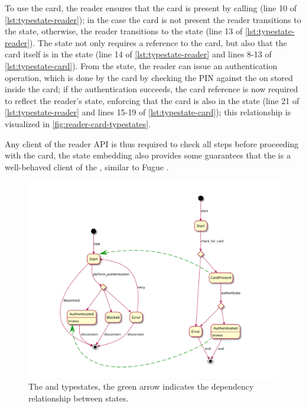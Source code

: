 To use the card, the reader ensures that the card is present by calling 
(line 10 of \autoref{lst:typestate-reader});
in the case the card is not present the reader transitions to the  state,
otherwise, the reader transitions to the  state (line 13 of \autoref{lst:typestate-reader}).
The  state not only requires a reference to the card,
but also that the card itself is in the  state (line 14 of \autoref{lst:typestate-reader}
and lines 8-13 of \autoref{lst:typestate-card}).
From the  state, the reader can issue an authentication operation,
which is done by the card by checking the PIN against the on stored inside the card;
if the authentication succeeds, the card reference is now required to reflect the reader's state,
enforcing that the card is also in the  state
(line 21 of \autoref{lst:typestate-reader} and lines 15-19 of \autoref{lst:typestate-card});
this relationship is visualized in \autoref{fig:reader-card-typestates}.

Any client of the reader API is thus required to check all steps before proceeding with the card,
the state embedding also provides some guarantees that the  is a well-behaved client of the ,
similar to Fugue \autocite{DeLine2004}.

\begin{figure}
    \centering
    \includegraphics[width=\linewidth]{Chapters/Figures/C5/reader_typestates.pdf}
    \caption{The  and  typestates, the green arrow indicates the dependency relationship between states.}
    \label{fig:reader-card-typestates}
\end{figure}

